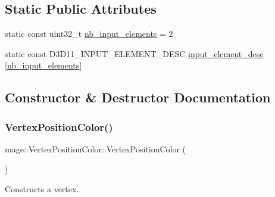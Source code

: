 \subsection*{Static Public Attributes}
\begin{DoxyCompactItemize}
\item 
static const uint32\+\_\+t \hyperlink{structmage_1_1_vertex_position_color_a5cf281fd9ddf28f5d1120bb540417ada}{nb\+\_\+input\+\_\+elements} = 2
\item 
static const D3\+D11\+\_\+\+I\+N\+P\+U\+T\+\_\+\+E\+L\+E\+M\+E\+N\+T\+\_\+\+D\+E\+SC \hyperlink{structmage_1_1_vertex_position_color_a29c05b95b7305ed7552ce22892d17371}{input\+\_\+element\+\_\+desc} \mbox{[}\hyperlink{structmage_1_1_vertex_position_color_a5cf281fd9ddf28f5d1120bb540417ada}{nb\+\_\+input\+\_\+elements}\mbox{]}
\end{DoxyCompactItemize}


\subsection{Constructor \& Destructor Documentation}
\hypertarget{structmage_1_1_vertex_position_color_a9346fd83bc634a105b3d81231c42136b}{}\label{structmage_1_1_vertex_position_color_a9346fd83bc634a105b3d81231c42136b} 
\subsubsection{\texorpdfstring{Vertex\+Position\+Color()}{VertexPositionColor()}\hspace{0.1cm}{\footnotesize\ttfamily [1/3]}}
{\footnotesize\ttfamily mage\+::\+Vertex\+Position\+Color\+::\+Vertex\+Position\+Color (\begin{DoxyParamCaption}{ }\end{DoxyParamCaption})\hspace{0.3cm}{\ttfamily [default]}}

Constructs a vertex. \hypertarget{structmage_1_1_vertex_position_color_aa41e2d55816bf687261f91f8e79846f2}{}\label{structmage_1_1_vertex_position_color_aa41e2d55816bf687261f91f8e79846f2} 
